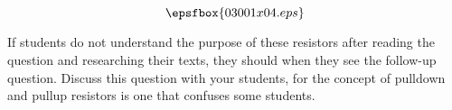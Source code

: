 $$\epsfbox{03001x04.eps}$$







If students do not understand the purpose of these resistors after reading the question and researching their texts, they should when they see the follow-up question.  Discuss this question with your students, for the concept of pulldown and pullup resistors is one that confuses some students.




